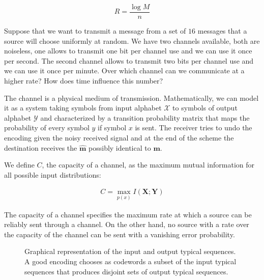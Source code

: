\begin{equation}
R=\frac{\log M}{n}
\end{equation}

\begin{exercise}
Suppose that we want to transmit a message from a set of $16$ messages that a source will choose uniformly at random. We have two channels available, both are noiseless, one allows to transmit one bit per channel use and we can use it once per second. The second channel allows to transmit two bits per channel use and we can use it once per minute. Over which channel can we communicate at a higher rate? How does time influence this number?
\end{exercise}
The channel is a physical medium of transmission. Mathematically, we can model it as a system taking symbols from input alphabet $\mathcal{X}$ to symbols of output alphabet $\mathcal{Y}$ and characterized by a transition probability matrix that maps the probability of every symbol $y$ if symbol $x$ is sent. The receiver tries to undo the encoding given the noisy received signal and at the end of the scheme the destination receives the $\mathbf{\hat{m}}$ possibly identical to $\mathbf m$.

We define $C$, the capacity of a channel, as the maximum mutual information for all possible input distributions: 

\begin{eqnarray}
\label{eq:capform}
C = \max_{p(x)} I(\mathbf X;\mathbf Y)
\end{eqnarray}




The capacity of a channel specifies the maximum rate at which a source can be reliably sent through a channel. On the other hand, no source with a rate over the capacity of the channel can be sent with a vanishing error probability.

\begin{figure}
\begin{center}
\def\svgwidth{\columnwidth} 
 
\caption[Jointly typical sequences]{Graphical representation of the input and output typical sequences. A good encoding chooses as codewords a subset of the input typical sequences that produces disjoint sets of output typical sequences.}
\label{fig:channel}
\end{center}
\end{figure}


